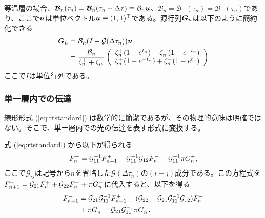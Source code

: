 等温層の場合、$\boldsymbol{\mathcal{B}}_n (\tau_n) = \boldsymbol{\mathcal{B}}_n (\tau_n + \Delta \tau) \equiv \mathcal{B}_n \boldsymbol{u}$、$\mathcal{B}_n = \mathcal{B}^+ (\tau_n) = \mathcal{B}^- (\tau_n)$であり、ここで$\boldsymbol{u}$は単位ベクトル$\boldsymbol{u} \equiv (1,1)^\top$である。源行列$\boldsymbol{G}_n$は以下のように簡約化できる
\begin{align}
\boldsymbol{G}_n &= \mathcal{B}_n (I - \mathcal{G} (\Delta \tau_n) ) \boldsymbol{u} \\
&= \frac{\mathcal{B}_n}{\zeta_n^+ + \zeta_n^-} \left(
\begin{array}{c}
     \zeta_n^+ (1 - e^{t_n}) + \zeta_n^- (1 - e^{-t_n}) \\
    \zeta_n^+ (1 - e^{-t_n}) + \zeta_n^- (1 - e^{t_n})
\end{array}
\right)
\end{align}
ここで$I$は単位行列である。

\subsubsection*{単一層内での伝達}

線形形式 (\ref{eq:rtstandard}) は数学的に簡潔であるが、その物理的意味は明確ではない。そこで、単一層内での光の伝達を表す形式に変換する。

式 (\ref{eq:rtstandard}) から以下が得られる
\begin{align}
    F^+_n = \mathcal{G}_{11}^{-1} F^+_{n+1} - \mathcal{G}_{11}^{-1} \mathcal{G}_{12} F^-_n -\mathcal{G}_{11}^{-1} \pi G_n^+,
\end{align}
ここで$\mathcal{G}_{ij}$は記号から$n$を省略した$\mathcal{G}(\Delta \tau_n)$の$(i-j)$成分である。この方程式を
$F^-_{n+1} = \mathcal{G}_{21} F^+_{n} + \mathcal{G}_{22} F^-_n + \pi G_n^-$に代入すると、以下を得る
\begin{align}
F^-_{n+1} &= \mathcal{G}_{21} \mathcal{G}_{11}^{-1} F^+_{n+1} + (\mathcal{G}_{22} - \mathcal{G}_{21} \mathcal{G}_{11}^{-1} \mathcal{G}_{12}) F^-_n \nonumber \\
&+ \pi G_n^- - \mathcal{G}_{21} \mathcal{G}_{11}^{-1} \pi G_n^+ .
\end{align}


